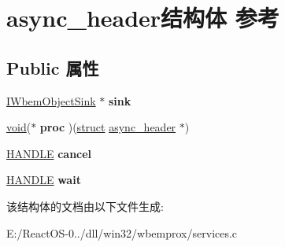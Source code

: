 \hypertarget{structasync__header}{}\section{async\+\_\+header结构体 参考}
\label{structasync__header}
\subsection*{Public 属性}
\begin{DoxyCompactItemize}
\item 
\mbox{\label{structasync__header_a7903462e76b4a275b49a106d454ca90a}} 
\hyperlink{interface_i_wbem_object_sink}{I\+Wbem\+Object\+Sink} $\ast$ {\bfseries sink}
\item 
\mbox{\label{structasync__header_a68182e9a717403a889d543ced1b1fe69}} 
\hyperlink{interfacevoid}{void}($\ast$ {\bfseries proc} )(\hyperlink{interfacestruct}{struct} \hyperlink{structasync__header}{async\+\_\+header} $\ast$)
\item 
\mbox{\label{structasync__header_a8820f8b405e992e6cf567f00b6839234}} 
\hyperlink{interfacevoid}{H\+A\+N\+D\+LE} {\bfseries cancel}
\item 
\mbox{\label{structasync__header_a501e088d12cde4e481b49f375b838e3d}} 
\hyperlink{interfacevoid}{H\+A\+N\+D\+LE} {\bfseries wait}
\end{DoxyCompactItemize}


该结构体的文档由以下文件生成\+:\begin{DoxyCompactItemize}
\item 
E\+:/\+React\+O\+S-\/0../dll/win32/wbemprox/services.\+c\end{DoxyCompactItemize}
